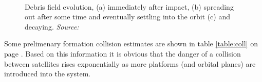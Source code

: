 \begin{figure}
  \centering
  \\
  \caption{Debris field evolution, (a) immediately after impact, (b) spreading out after some time and eventually settling into the orbit (c) and decaying. \emph{Source: \cite{constDesign}}}
  \label{fig:debris}
\end{figure}

Some prelimenary formation collision estimates are shown in table \ref{table:coll} on page \pageref{table:coll}. Based on this information it is obvious that the danger of a collision  between satellites rises exponentially as more platforms (and orbital planes) are introduced into the system.

